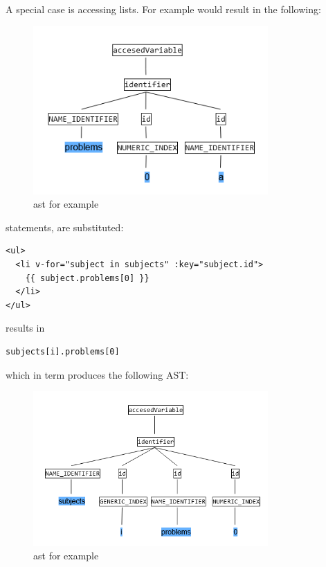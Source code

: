 A special case is accessing lists. For example  would result in the following:

\begin{figure}[H]
    \includegraphics[width=0.8\textwidth]{images/ast_problems_0_a.png}
     \caption{\gls{ast} for example }
     \label{fig:ast_list_simple}
\end{figure}


 statements, are substituted:
\begin{lstlisting}[style=html]
<ul>
  <li v-for="subject in subjects" :key="subject.id">
    {{ subject.problems[0] }}
  </li>
</ul>
\end{lstlisting}
results in
\begin{lstlisting}[style=html]
subjects[i].problems[0]
\end{lstlisting}
which in term produces the following AST:

\begin{figure}[H]
    \includegraphics[width=0.8\textwidth]{images/ast_numeric_generic.png}
     \caption{\gls{ast} for example }
     \label{fig:ast_list_complex}
\end{figure}


